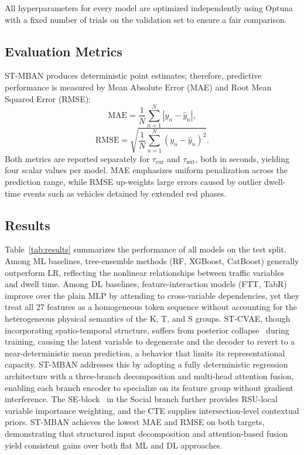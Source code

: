 \documentclass[journal]{IEEEtran}
\begin{document}
All hyperparameters for every model are optimized independently using Optuna~\cite{Optuna2019} with a fixed number of trials on the validation set to ensure a fair comparison.

\subsection{Evaluation Metrics}
ST-MBAN produces deterministic point estimates; therefore, predictive performance is measured by Mean Absolute Error (MAE) and Root Mean Squared Error (RMSE):
\begin{equation}
    \text{MAE} = \frac{1}{N}\sum_{n=1}^{N} |y_n - \hat{y}_n|,
    \label{eq:mae}
\end{equation}
\begin{equation}
    \text{RMSE} = \sqrt{\frac{1}{N}\sum_{n=1}^{N} (y_n - \hat{y}_n)^2}.
    \label{eq:rmse}
\end{equation}
Both metrics are reported separately for $\tau_\text{cur}$ and $\tau_\text{nxt}$, both in seconds, yielding four scalar values per model.
MAE emphasizes uniform penalization across the prediction range, while RMSE up-weights large errors caused by outlier dwell-time events such as vehicles detained by extended red phases.

\subsection{Results}

Table~\ref{tab:results} summarizes the performance of all models on the test split.
Among ML baselines, tree-ensemble methods (RF, XGBoost, CatBoost) generally outperform LR, reflecting the nonlinear relationships between traffic variables and dwell time.
Among DL baselines, feature-interaction models (FTT, TabR) improve over the plain MLP by attending to cross-variable dependencies, yet they treat all 27 features as a homogeneous token sequence without accounting for the heterogeneous physical semantics of the K, T, and S groups.
ST-CVAE, though incorporating spatio-temporal structure, suffers from posterior collapse~\cite{posteriorCollapse} during training, causing the latent variable to degenerate and the decoder to revert to a near-deterministic mean prediction, a behavior that limits its representational capacity.
ST-MBAN addresses this by adopting a fully deterministic regression architecture with a three-branch decomposition and multi-head attention fusion, enabling each branch encoder to specialize on its feature group without gradient interference.
The SE-block~\cite{Hu2018SENet} in the Social branch further provides RSU-local variable importance weighting, and the CTE supplies intersection-level contextual priors.
ST-MBAN achieves the lowest MAE and RMSE on both targets, demonstrating that structured input decomposition and attention-based fusion yield consistent gains over both flat ML and DL approaches.
\end{document}
